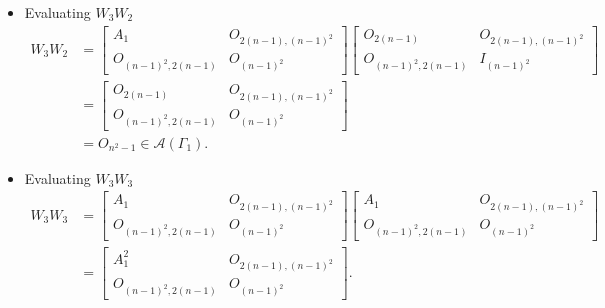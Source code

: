 \begin{itemize}
    \item Evaluating $W_3W_2$
    \begin{align*}
        W_3W_2
        &=
        \begin{bmatrix}
            A_1 & O_{2(n-1), (n-1)^2} \\
            O_{(n-1)^2, 2(n-1)} & O_{(n-1)^2}
        \end{bmatrix}\begin{bmatrix}
            O_{2(n-1)} & O_{2(n-1), (n-1)^2} \\
            O_{(n-1)^2, 2(n-1)} & I_{(n-1)^2}
        \end{bmatrix} \\
        &= \begin{bmatrix}
            O_{2(n-1)} & O_{2(n-1), (n-1)^2} \\
            O_{(n-1)^2, 2(n-1)} & O_{(n-1)^2}
        \end{bmatrix} \\
        &= O_{n^2-1} \in \mathcal{A}(\Gamma_1).
    \end{align*}
    
    \item Evaluating $W_3W_3$
    \begin{align*}
        W_3W_3
        &=\begin{bmatrix}
            A_1 & O_{2(n-1), (n-1)^2} \\
            O_{(n-1)^2, 2(n-1)} & O_{(n-1)^2}
        \end{bmatrix}\begin{bmatrix}
            A_1 & O_{2(n-1), (n-1)^2} \\
            O_{(n-1)^2, 2(n-1)} & O_{(n-1)^2}
        \end{bmatrix} \\
        &= \begin{bmatrix}
            A_1^2 & O_{2(n-1), (n-1)^2} \\
            O_{(n-1)^2, 2(n-1)} & O_{(n-1)^2}
        \end{bmatrix}.
    \end{align*}


\end{itemize}
